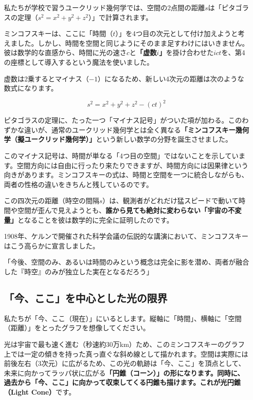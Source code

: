 私たちが学校で習うユークリッド幾何学では、空間の2点間の距離\(s\)は「ピタゴラスの定理（\(s^2=x^2+y^2+z^2\)）」で計算されます。

ミンコフスキーは、ここに「時間（\(t\)）」を4つ目の次元として付け加えようと考えました。しかし、時間を空間と同じようにそのまま足すわけにはいきません。彼は数学的な直感から、時間に光の速さ\(c\)と\textbf{「虚数\(i\)」}を掛け合わせた\(ict\)を、第4の座標として導入するという魔法を使いました。

虚数は2乗するとマイナス（\(-1\)）になるため、新しい4次元の距離は次のような数式になります。

\[
s^2=x^2+y^2+z^2-(ct)^2
\]

ピタゴラスの定理に、たった一つ「マイナス記号」がついた項が加わる。このわずかな違いが、通常のユークリッド幾何学とは全く異なる\textbf{「ミンコフスキー幾何学（擬ユークリッド幾何学）」}という新しい数学の分野を誕生させました。

このマイナス記号は、時間が単なる「4つ目の空間」ではないことを示しています。空間方向には自由に行ったり来たりできますが、時間方向には因果律という向きがあります。ミンコフスキーの式は、時間と空間を一つに統合しながらも、両者の性格の違いをきちんと残しているのです。

この四次元の距離（時空の間隔\(s\)）は、観測者がどれだけ猛スピードで動いて時間や空間が歪んで見えようとも、\textbf{誰から見ても絶対に変わらない「宇宙の不変量」}となることを彼は数学的に完全に証明したのです。

1908年、ケルンで開催された科学会議の伝説的な講演において、ミンコフスキーはこう高らかに宣言しました。

「今後、空間のみ、あるいは時間のみという概念は完全に影を潜め、両者が融合した『時空』のみが独立した実在となるだろう」

\subsection{「今、ここ」を中心とした光の限界}

私たちが「今、ここ（現在）」にいるとします。縦軸に「時間」、横軸に「空間（距離）」をとったグラフを想像してください。

光は宇宙で最も速く進む（秒速約30万km）ため、このミンコフスキーのグラフ上では一定の傾きを持った真っ直ぐな斜め線として描かれます。空間は実際には前後左右（3次元）に広がるため、この光の軌跡は「今、ここ」を頂点として、未来に向かってラッパ状に広がる\textbf{「円錐（コーン）」の形になります。同時に、過去から「今、ここ」に向かって収束してくる円錐も描けます。これが光円錐（Light Cone）}です。

